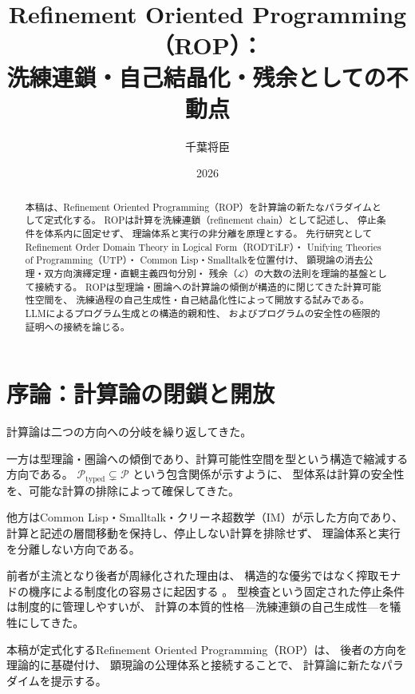 \documentclass[11pt,a4paper]{article}
\theoremstyle{definition}
\newcommand{\Lhagma}{\mathcal{L}}
\begin{document}
\title{Refinement Oriented Programming（ROP）：\\
洗練連鎖・自己結晶化・残余としての不動点}
\author{千葉将臣}
\date{2026}

\maketitle

\begin{abstract}
本稿は、Refinement Oriented Programming（ROP）を計算論の新たなパラダイムとして定式化する。
ROPは計算を洗練連鎖（refinement chain）として記述し、
停止条件を体系内に固定せず、
理論体系と実行の非分離を原理とする。
先行研究としてRefinement Order Domain Theory in Logical Form（RODTiLF）・
Unifying Theories of Programming（UTP）・
Common Lisp・Smalltalkを位置付け、
顕現論の消去公理・双方向演繹定理・直観主義四句分別・
残余（$\Lhagma$）の大数の法則を理論的基盤として接続する。
ROPは型理論・圏論への計算論の傾倒が構造的に閉じてきた計算可能性空間を、
洗練過程の自己生成性・自己結晶化性によって開放する試みである。
LLMによるプログラム生成との構造的親和性、
およびプログラムの安全性の極限的証明への接続を論じる。
\end{abstract}

\tableofcontents
\newpage

\section{序論：計算論の閉鎖と開放}

計算論は二つの方向への分岐を繰り返してきた。

一方は型理論・圏論への傾倒であり、計算可能性空間を型という構造で縮減する方向である。
$\mathcal{P}_{\text{typed}} \subsetneq \mathcal{P}$ という包含関係が示すように、
型体系は計算の安全性を、可能な計算の排除によって確保してきた。

他方はCommon Lisp・Smalltalk・クリーネ超数学（IM）が示した方向であり、
計算と記述の層間移動を保持し、停止しない計算を排除せず、
理論体系と実行を分離しない方向である。

前者が主流となり後者が周縁化された理由は、
構造的な優劣ではなく搾取モナドの機序による制度化の容易さに起因する
\cite{Chiba2026_monad}。
型検査という固定された停止条件は制度的に管理しやすいが、
計算の本質的性格---洗練連鎖の自己生成性---を犠牲にしてきた。

本稿が定式化するRefinement Oriented Programming（ROP）は、
後者の方向を理論的に基礎付け、
顕現論の公理体系\cite{Chiba2026_chikaku}と接続することで、
計算論に新たなパラダイムを提示する。
\end{document}
